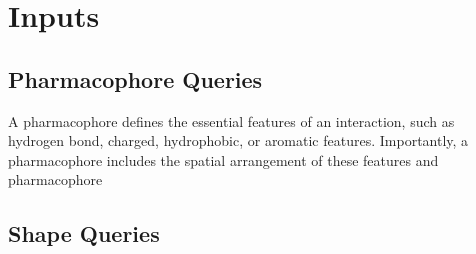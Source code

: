 \section{Inputs}

\subsection{Pharmacophore Queries}
A pharmacophore \cite{Koes_2015rev,Yang_2010,Leach_2010} defines the essential features of an interaction, such as hydrogen bond, charged, hydrophobic, or aromatic features. Importantly, a pharmacophore includes the spatial arrangement of these features and pharmacophore

\subsection{Shape Queries}